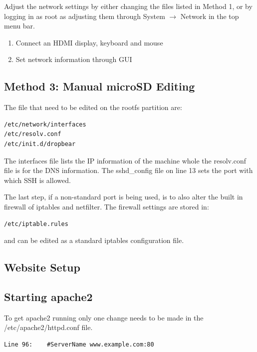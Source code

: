 Adjust the network settings by either changing the files listed in Method 1, or by logging in as root as adjusting them through System $\rightarrow$ Network in the top menu bar.

\begin{enumerate}
\item{Connect an HDMI display, keyboard and mouse}
\item{Set network information through GUI}
\end{enumerate}


\subsection*{Method 3: Manual microSD Editing}

The file that need to be edited on the rootfs partition are:

\begin{verbatim}
/etc/network/interfaces
/etc/resolv.conf
/etc/init.d/dropbear
\end{verbatim}

The interfaces file lists the IP information of the machine whole the resolv.conf file is for the DNS information.
The sshd\_config file on line 13 sets the port with which SSH is allowed.

The last step, if a non-standard port is being used, is to also alter the built in firewall of iptables and netfilter.
The firewall settings are stored in:

\begin{verbatim}
/etc/iptable.rules
\end{verbatim}

and can be edited as a standard iptables configuration file.

\subsection{Website Setup}
\label{app:gumstix:website}

\subsection*{Starting apache2}

To get apache2 running only one change needs to be made in the /etc/apache2/httpd.conf file.

\begin{verbatim}
Line 96:	#ServerName www.example.com:80
\end{verbatim}

